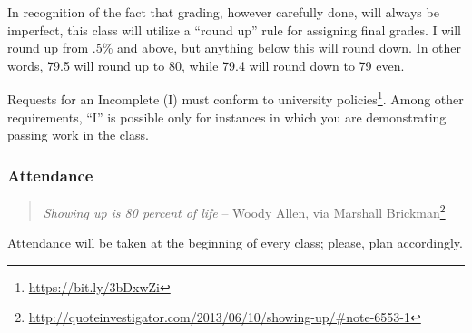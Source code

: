 \documentclass[
  letterpaper,
  DIV=11,
  numbers=noendperiod]{scrartcl}
\DeclareRobustCommand{\href}[2]{#2\footnote{\url{#1}}}
\begin{document}
\begin{tcolorbox}[enhanced jigsaw, toptitle=1mm, left=2mm, colframe=quarto-callout-note-color-frame, titlerule=0mm, opacityback=0, colbacktitle=quarto-callout-note-color!10!white, opacitybacktitle=0.6, leftrule=.75mm, toprule=.15mm, bottomrule=.15mm, rightrule=.15mm, bottomtitle=1mm, breakable, title=\textcolor{quarto-callout-note-color}{\faInfo}\hspace{0.5em}{Note}, coltitle=black, arc=.35mm, colback=white]

In recognition of the fact that grading, however carefully done, will
always be imperfect, this class will utilize a ``round up'' rule for
assigning final grades. I will round up from .5\% and above, but
anything below this will round down. In other words, 79.5 will round up
to 80, while 79.4 will round down to 79 even.

\end{tcolorbox}

\begin{tcolorbox}[enhanced jigsaw, toptitle=1mm, left=2mm, colframe=quarto-callout-important-color-frame, titlerule=0mm, opacityback=0, colbacktitle=quarto-callout-important-color!10!white, opacitybacktitle=0.6, leftrule=.75mm, toprule=.15mm, bottomrule=.15mm, rightrule=.15mm, bottomtitle=1mm, breakable, title=\textcolor{quarto-callout-important-color}{\faExclamation}\hspace{0.5em}{Important}, coltitle=black, arc=.35mm, colback=white]

Requests for an Incomplete (I) must conform to
\href{https://bit.ly/3bDxwZi}{university policies}. Among other
requirements, ``I'' is possible only for instances in which you are
demonstrating passing work in the class.

\end{tcolorbox}

\hypertarget{attendance}{%
\subsubsection{Attendance}\label{attendance}}

\begin{quote}
\emph{Showing up is 80 percent of life} -- Woody Allen,
\href{http://quoteinvestigator.com/2013/06/10/showing-up/\#note-6553-1}{via
Marshall Brickman}
\end{quote}

Attendance will be taken at the beginning of every class; please, plan
accordingly.
\end{document}
